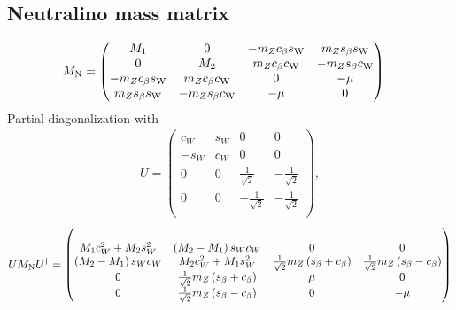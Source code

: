 \documentclass[a4paper]{article}
\newcommand{\s}[1]{_{\rm #1}}
\begin{document}
\subsection{Neutralino mass matrix}
\begin{align}
 M\s N &=
\begin{pmatrix}
 M_1 & 0 & -m_Z c_\beta s\s W & m_Z
   s_\beta s\s W\\
 0 & M_2 & m_Zc_\beta c\s W & -m_Z
   s_\beta c\s W \\
 -m_Z c_\beta s\s W & m_Z c_\beta c\s W & 0 & -\mu  \\
 m_Z s_\beta s\s W & -m_Z s_\beta
   c\s W & -\mu  & 0 \\
\end{pmatrix}
\end{align}
Partial diagonalization with
\begin{align}
 U=
\begin{pmatrix}
 c_W & s_W & 0 & 0 \\
 -s_W & c_W & 0 & 0 \\
 0 & 0 & \frac{1}{\sqrt{2}} & -\frac{1}{\sqrt{2}} \\
 0 & 0 & -\frac{1}{\sqrt{2}} & -\frac{1}{\sqrt{2}} \\
\end{pmatrix},
\end{align}
\begin{align}
 UM\s NU^\dagger = \begin{pmatrix}\\
 M_1 c_W^2+M_2 s_W^2 & \left(M_2-M_1\right) s_Wc_W & 0 & 0 \\
 \left(M_2-M_1\right) s_Wc_W & M_2 c_W^2+M_1 s_W^2 & \frac1{\sqrt2}m_Z \left(s_{\beta
   }+c_{\beta }\right) & \frac1{\sqrt2}m_Z \left(s_{\beta }-c_{\beta
   }\right)\\
 0 & \frac1{\sqrt2}m_Z \left(s_{\beta }+c_{\beta }\right)& \mu  & 0 \\
 0 & \frac1{\sqrt2}m_Z \left(s_{\beta }-c_{\beta }\right) & 0 & -\mu  \\
                   \end{pmatrix}
\end{align}
\end{document}
